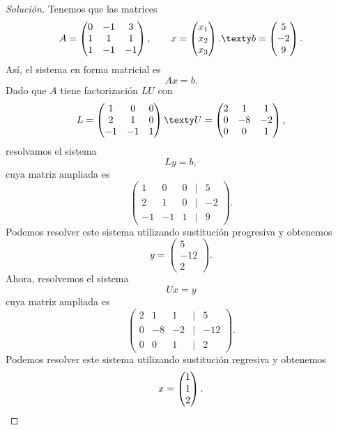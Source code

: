 \documentclass[a4,11pt]{aleph-notas}
\begin{document}
\begin{proof}[Solución]
    Tenemos que las matrices
    \[
        A = \begin{pmatrix}
            0&-1&3\\1&1&1\\1&-1&-1
        \end{pmatrix},
        \qquad
        x = \begin{pmatrix}
            x_1 \\ x_2\\ x_3
        \end{pmatrix}.
        \texty
        b = \begin{pmatrix}
            5 \\ -2 \\ 9
        \end{pmatrix}.
    \]
    Así, el sistema en forma matricial es
    \[
        Ax = b.
    \]
    Dado que $A$ tiene factorización $LU$ con
    \[
        L = 
        \begin{pmatrix}
             1 &  0 & 0\\
             2 &  1 & 0\\
            -1 & -1 & 1
        \end{pmatrix}
        \texty
        U = 
        \begin{pmatrix}
             2 &  1 & 1\\
             0 & -8 & -2\\
             0 &  0 & 1
        \end{pmatrix},
    \]
    resolvamos el sistema
    \[
        Ly = b,
    \]
    cuya matriz ampliada es
    \[
        \begin{pmatrix}
             1 &  0 & 0 & | & 5 \\
             2 &  1 & 0 & | & -2\\
            -1 & -1 & 1 & | & 9
        \end{pmatrix}.
    \]
   Podemos resolver este sistema utilizando sustitución progresiva y obtenemos
    \[
        y =
        \begin{pmatrix}
            5 \\ -12 \\ 2
        \end{pmatrix}.
    \]
    Ahora, resolvemos el sistema
    \[
        Ux = y
    \]
    cuya matriz ampliada es
    \[
        \begin{pmatrix}
             2 &  1 & 1 & | & 5 \\
            0  & -8 &-2 & | & -12\\
             0 &  0 & 1 & | & 2
        \end{pmatrix}.
    \]
   Podemos resolver este sistema utilizando sustitución regresiva y obtenemos
    \[
        x =
        \begin{pmatrix}
            1 \\ 1 \\ 2
        \end{pmatrix}.\qedhere
    \]
\end{proof}
\end{document}
